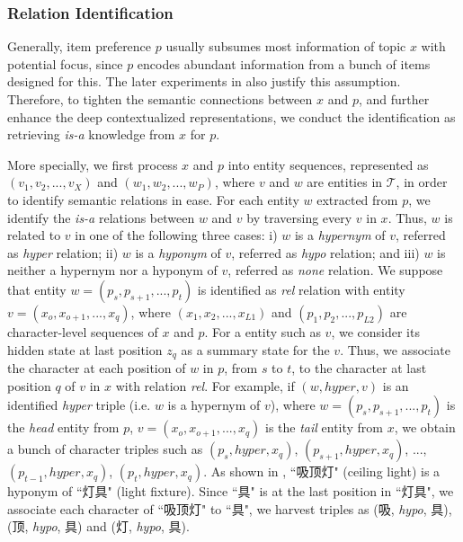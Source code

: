 \subsubsection{Relation Identification}
\label{sec:identification}
Generally, item preference $p$ usually subsumes most information
of topic $x$ with potential focus, since $p$ encodes abundant information from a bunch of 
items designed for this. 
The later experiments in  also justify this assumption.
Therefore, to tighten the semantic connections between $x$ and $p$,
and further enhance the deep contextualized representations,
we conduct the identification as retrieving 
\emph{is-a} knowledge from $x$ for $p$.

More specially,
we first process $x$ and $p$ into entity sequences, represented as 
$(v_1, v_2, ..., v_X)$ and $(w_1, w_2, ..., w_P)$, where $v$ and $w$
are entities in $\mathcal{T}$,  in order to identify semantic relations in ease.
For each entity $w$ extracted from $p$, 
we identify the \emph{is-a} relations 
between $w$ and $v$ by traversing every $v$ in $x$.
Thus, $w$ is related to $v$ in one of the following three cases:
 i) $w$ is a \emph{hypernym} of $v$, referred as \emph{hyper} relation;
 ii) $w$ is a \emph{hyponym} of $v$, referred as \emph{hypo} relation;
 and iii) $w$ is neither a hypernym nor a hyponym of $v$, referred as \emph{none} relation.
We suppose that entity $w=(p_s, p_{s+1}, ..., p_{t})$ is identified as \emph{rel} relation with 
entity $v = (x_o, x_{o+1}, ..., x_{q})$,
where $(x_1, x_2, ..., x_{L1})$ and $(p_1, p_2, ..., p_{L2})$ are
character-level sequences of $x$ and $p$.
For a entity such as $v$, we consider its hidden state at last position $z_q$
as a summary state for the $v$.
Thus, we associate the character at each position of $w$ in $p$, from $s$ to $t$,  to 
the character at last position $q$ of $v$ in $x$ with relation \emph{rel}.
For example, if $(w, hyper, v)$ is an identified \emph{hyper} triple 
(i.e. $w$ is a hypernym of $v$), 
where $w=(p_s, p_{s+1}, ..., p_{t})$ is the \emph{head} entity from $p$, 
$v = (x_o, x_{o+1}, ..., x_{q})$ is the \emph{tail} entity from $x$,
we obtain a bunch of character triples such as $(p_s, hyper, x_q)$, 
$(p_{s+1}, hyper, x_q)$, ..., $(p_{t-1}, hyper, x_q)$, $(p_{t}, hyper, x_q)$.
As shown in ,
``吸顶灯" (ceiling light) is a hyponym of ``灯具" (light fixture).
Since ``具" is at the last position in ``灯具", we associate each character
of ``吸顶灯" to ``具", we harvest triples
as (吸, \emph{hypo}, 具), (顶, \emph{hypo}, 具) and (灯, \emph{hypo}, 具).

